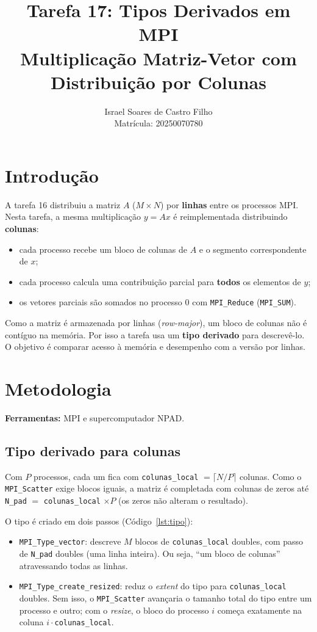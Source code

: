 \documentclass[a4paper,12pt]{article}
\title{Tarefa 17: Tipos Derivados em MPI \\ \large Multiplicação Matriz-Vetor com Distribuição por Colunas}
\author{Israel Soares de Castro Filho \\ Matrícula: 20250070780}
\date{}
\begin{document}
\maketitle

\section{Introdução}

A tarefa 16 distribuiu a matriz $A$ ($M \times N$) por \textbf{linhas} entre os processos MPI. Nesta tarefa, a mesma multiplicação $y = Ax$ é reimplementada distribuindo \textbf{colunas}:

\begin{itemize}
    \item cada processo recebe um bloco de colunas de $A$ e o segmento correspondente de $x$;
    \item cada processo calcula uma contribuição parcial para \textbf{todos} os elementos de $y$;
    \item os vetores parciais são somados no processo 0 com \texttt{MPI\_Reduce} (\texttt{MPI\_SUM}).
\end{itemize}

Como a matriz é armazenada por linhas (\emph{row-major}), um bloco de colunas não é contíguo na memória. Por isso a tarefa usa um \textbf{tipo derivado} para descrevê-lo. O objetivo é comparar acesso à memória e desempenho com a versão por linhas.

\section{Metodologia}

\textbf{Ferramentas:} MPI e supercomputador NPAD.

\subsection{Tipo derivado para colunas}

Com $P$ processos, cada um fica com \texttt{colunas\_local} $= \lceil N/P \rceil$ colunas. Como o \texttt{MPI\_Scatter} exige blocos iguais, a matriz é completada com colunas de zeros até \texttt{N\_pad} $=$ \texttt{colunas\_local} $\times P$ (os zeros não alteram o resultado).

O tipo é criado em dois passos (Código~\ref{lst:tipo}):

\begin{itemize}
    \item \texttt{MPI\_Type\_vector}: descreve $M$ blocos de \texttt{colunas\_local} doubles, com passo de \texttt{N\_pad} doubles (uma linha inteira). Ou seja, ``um bloco de colunas'' atravessando todas as linhas.
    \item \texttt{MPI\_Type\_create\_resized}: reduz o \emph{extent} do tipo para \texttt{colunas\_local} doubles. Sem isso, o \texttt{MPI\_Scatter} avançaria o tamanho total do tipo entre um processo e outro; com o \emph{resize}, o bloco do processo $i$ começa exatamente na coluna $i \cdot$\texttt{colunas\_local}.
\end{itemize}
\end{document}
